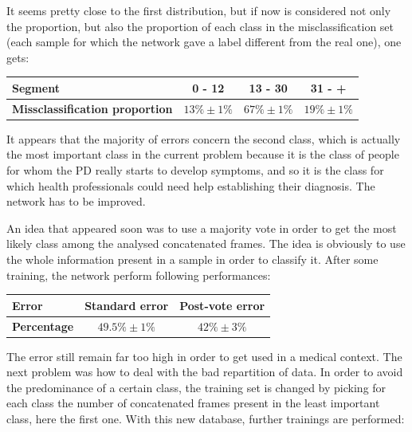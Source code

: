 \documentclass{report}
\begin{document}
	It seems pretty close to the first distribution, but if now is considered not only the proportion, but also the proportion of each class in the misclassification set (each sample for which the network gave a label different from the real one), one gets:
	
	\vspace{0.5cm}
	\begin{center}
		\begin{tabular}{|l|c|c|c|}
			\hline \textbf{Segment} & \textbf{0 - 12} & \textbf{13 - 30} & \textbf{31 - +}\\
			\hline \textbf{Missclassification proportion} & $13\% \pm 1\%$ & $67\% \pm 1\%$ & $19\% \pm 1\%$ \\
			\hline
		\end{tabular}
	\end{center}
	\vspace{0.5cm}
	
	It appears that the majority of errors concern the second class, which is actually the most important class in the current problem because it is the class of people for whom the PD really starts to develop symptoms, and so it is the class for which health professionals could need help establishing their diagnosis. The network has to be improved.
	
	An idea that appeared soon was to use a majority vote in order to get the most likely class among the analysed concatenated frames. The idea is obviously to use the whole information present in a sample in order to classify it. After some training, the network perform following performances:
	
	\vspace{0.5cm}
	\begin{center}
		\begin{tabular}{|l|c|c|}
			\hline \textbf{Error} & \textbf{Standard error} & \textbf{Post-vote error}\\
			\hline \textbf{Percentage} & $49.5\% \pm 1\%$ & $42\% \pm 3\%$\\
			\hline
		\end{tabular}
	\end{center}
	\vspace{0.5cm}
	
	The error still remain far too high in order to get used in a medical context. The next problem was how to deal with the bad repartition of data. In order to avoid the predominance of a certain class, the training set is changed by picking for each class the number of concatenated frames present in the least important class, here the first one. With this new database, further trainings are performed:
	
\end{document}
